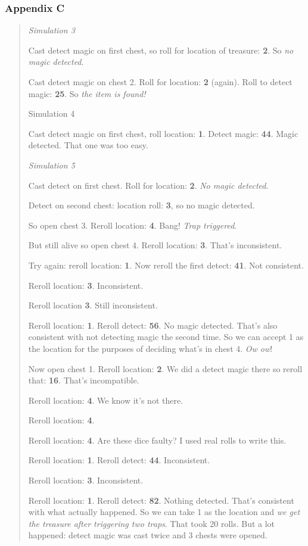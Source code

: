 \documentclass[12pt]{article}
\begin{document}
\iffalse
\hypertarget{appendix-c}{%
\subsubsection{Appendix C}\label{appendix-c}}

\begin{quote}
\emph{Simulation 3}

Cast detect magic on first chest, so roll for location of treasure:
\textbf{2}. So \emph{no magic detected}.

Cast detect magic on chest 2. Roll for location: \textbf{2} (again).
Roll to detect magic: \textbf{25}. So \emph{the item is found!}

Simulation 4

Cast detect magic on first chest, roll location: \textbf{1}. Detect
magic: \textbf{44}. Magic detected. That one was too easy.

\emph{Simulation 5}

Cast detect on first chest. Roll for location: \textbf{2}. \emph{No
magic detected}.

Detect on second chest: location roll: \textbf{3}, so no magic detected.

So open chest 3. Reroll location: \textbf{4}. Bang! \emph{Trap
triggered}.

But still alive so open chest 4. Reroll location: \textbf{3}.
That's inconsistent.

Try again: reroll location: \textbf{1}. Now reroll the first detect:
\textbf{41}. Not consistent.

Reroll location: \textbf{3}. Inconsistent.

Reroll location \textbf{3}. Still inconsistent.

Reroll location: \textbf{1}. Reroll detect: \textbf{56}. No magic
detected. That's also consistent with not detecting magic the
second time. So we can accept 1 as the location for the purposes of
deciding what's in chest 4. \emph{Ow ow}!

Now open chest 1. Reroll location: \textbf{2}. We did a detect magic
there so reroll that: \textbf{16}. That's incompatible.

Reroll location: \textbf{4}. We know it's not there.

Reroll location: \textbf{4}.

Reroll location: \textbf{4}. Are these dice faulty? I used real rolls to
write this.

Reroll location: \textbf{1}. Reroll detect: \textbf{44}. Inconsistent.

Reroll location: \textbf{3}. Inconsistent.

Reroll location: \textbf{1}. Reroll detect: \textbf{82}. Nothing
detected. That's consistent with what actually happened. So we can
take 1 as the location and \emph{we get the treasure after triggering
two traps}. That took 20 rolls. But a lot happened: detect magic was
cast twice and 3 chests were opened.
\end{quote}
\end{document}
